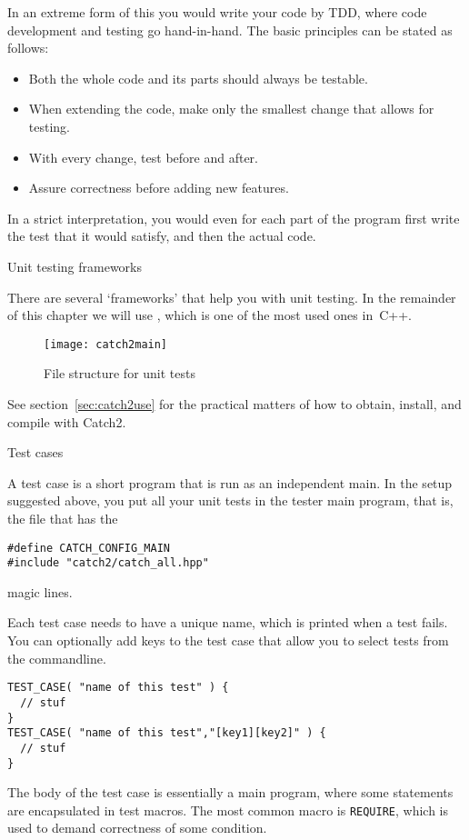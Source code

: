 In an extreme form of this you would write
your code by \acf{TDD}, where code development and testing
go hand-in-hand. The basic principles can be stated as follows:
\begin{itemize}
\item Both the whole code and its parts should always be testable.
\item When extending the code, make only the smallest change that allows for testing.
\item With every change, test before and after.
\item Assure correctness before adding new features.  
\end{itemize}
In a strict interpretation,
you would even for each part of the
program first write the test that it would satisfy,
and then the actual code.

 {Unit testing frameworks}
\label{sec:tdd}

There are several `frameworks' that help you with unit testing.
In the remainder of this chapter we will use ,
which is one of the most used ones in~C++.

\begin{figure}[t]
  \texttt{[image: catch2main]}
  \caption{File structure for unit tests}
  \label{fig:catch2main}
\end{figure}

See section~\ref{sec:catch2use}
for the practical matters of how to obtain, install, and compile with Catch2.

 {Test cases}

A test case is a short program that is run as an independent main.
In the setup suggested above, you put all your unit tests
in the tester main program, that is,
the file that has the
\begin{lstlisting}
#define CATCH_CONFIG_MAIN
#include "catch2/catch_all.hpp"
\end{lstlisting}
magic lines.

Each test case needs to have a unique name,
which is printed when a test fails.
You can optionally add keys to the test case
that allow you to select tests from the commandline.

\begin{lstlisting}
TEST_CASE( "name of this test" ) {
  // stuf
}
TEST_CASE( "name of this test","[key1][key2]" ) {
  // stuf
}
\end{lstlisting}

The body of the test case is essentially a main program,
where some statements are encapsulated in test macros.
The most common macro is \lstinline{REQUIRE},
which is used to demand correctness of some condition.

